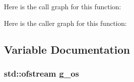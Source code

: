 Here is the call graph for this function\+:




Here is the caller graph for this function\+:




\subsection{Variable Documentation}
\subsubsection[{\texorpdfstring{g\+\_\+os}{g_os}}]{\setlength{\rightskip}{0pt plus 5cm}std\+::ofstream g\+\_\+os}\hypertarget{csma-packet-socket_8cc_a352b10ecde0ce8055a327bd473cc6fbb}{}\label{csma-packet-socket_8cc_a352b10ecde0ce8055a327bd473cc6fbb}

